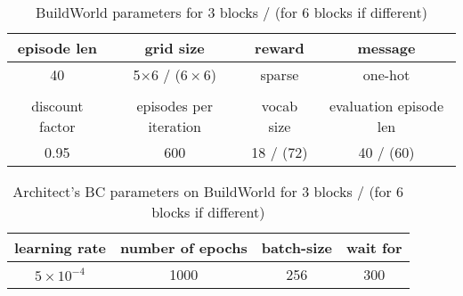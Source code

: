 
\begin{table}[h!]
    \centering
    \begin{tabular}{cccc}
        episode len & grid size & reward & message \\
        \hline
         40 & 5$\times$6 / ($6\times6$) & sparse & one-hot \\
         \\
         discount factor & episodes per iteration & vocab size & evaluation episode len\\
         \hline
         0.95 & 600 & 18 / (72) & 40 / (60)
    \end{tabular}
    \caption{BuildWorld parameters for 3 blocks / (for 6 blocks if different)}
\end{table}


\begin{table}[h!]
    \centering
    \begin{tabular}{cccc}
         learning rate & number of epochs  & batch-size & wait for \\
         \hline
         $5\times10^{-4}$ & 1000 & 256 & 300
    \end{tabular}
    \caption{Architect's BC parameters on BuildWorld for 3 blocks / (for 6 blocks if different)}
\end{table}

